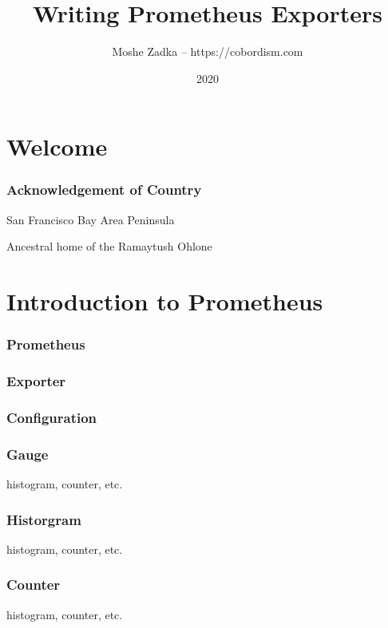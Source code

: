 \usepackage{hyperref}
\usepackage{graphicx}
\usepackage{listings}
\usepackage{textcomp}
\usepackage{fancyvrb}

\title{Writing Prometheus Exporters}
\author{Moshe Zadka -- https://cobordism.com}
\date{2020}


\begin{titlepage}
\maketitle
\end{titlepage}

\section{Welcome}

\frame{\titlepage}

\begin{frame}
\frametitle{Acknowledgement of Country}

San Francisco Bay Area Peninsula

Ancestral home of the Ramaytush Ohlone

\end{frame}

\section{Introduction to Prometheus}

\begin{frame}
\frametitle{Prometheus}
\end{frame}

\begin{frame}
\frametitle{Exporter}
\end{frame}

\begin{frame}
\frametitle{Configuration}
\end{frame}

\begin{frame}
\frametitle{Gauge}
histogram, counter, etc.
\end{frame}

\begin{frame}
\frametitle{Historgram}
histogram, counter, etc.
\end{frame}

\begin{frame}
\frametitle{Counter}
histogram, counter, etc.
\end{frame}

